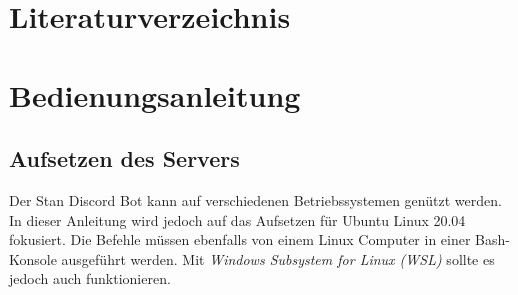 \documentclass[a4paper, table]{article}
\begin{document}
\section{Literaturverzeichnis}
\printbibliography

\newpage
\section{Bedienungsanleitung}\label{Bedienungsanleitung}

\subsection{Aufsetzen des Servers}

Der Stan Discord Bot kann auf verschiedenen Betriebssystemen genützt werden.
In dieser Anleitung wird jedoch auf das Aufsetzen für Ubuntu Linux 20.04 fokusiert.
Die Befehle müssen ebenfalls von einem Linux Computer in einer Bash-Konsole ausgeführt werden.
Mit \textit{Windows Subsystem for Linux (WSL)} sollte es jedoch auch funktionieren.
\end{document}
